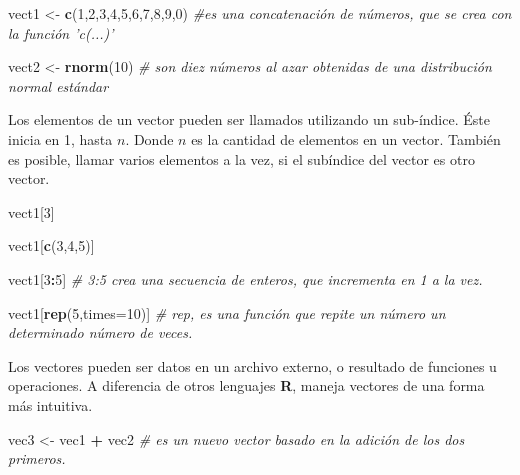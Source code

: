 \documentclass[12pt,letterpaper,]{book}
\newenvironment{Shaded}{\begin{snugshade}}{\end{snugshade}}
\newcommand{\KeywordTok}[1]{\textcolor[rgb]{0.13,0.29,0.53}{\textbf{#1}}}
\newcommand{\DataTypeTok}[1]{\textcolor[rgb]{0.13,0.29,0.53}{#1}}
\newcommand{\DecValTok}[1]{\textcolor[rgb]{0.00,0.00,0.81}{#1}}
\newcommand{\StringTok}[1]{\textcolor[rgb]{0.31,0.60,0.02}{#1}}
\newcommand{\CommentTok}[1]{\textcolor[rgb]{0.56,0.35,0.01}{\textit{#1}}}
\newcommand{\OperatorTok}[1]{\textcolor[rgb]{0.81,0.36,0.00}{\textbf{#1}}}
\newcommand{\NormalTok}[1]{#1}
\begin{document}
\begin{Shaded}
\begin{Highlighting}[]
\NormalTok{vect1 <-}\StringTok{ }\KeywordTok{c}\NormalTok{(}\DecValTok{1}\NormalTok{,}\DecValTok{2}\NormalTok{,}\DecValTok{3}\NormalTok{,}\DecValTok{4}\NormalTok{,}\DecValTok{5}\NormalTok{,}\DecValTok{6}\NormalTok{,}\DecValTok{7}\NormalTok{,}\DecValTok{8}\NormalTok{,}\DecValTok{9}\NormalTok{,}\DecValTok{0}\NormalTok{) }\CommentTok{#es una concatenación de números, que se crea con la función 'c(...)'}

\NormalTok{vect2 <-}\StringTok{ }\KeywordTok{rnorm}\NormalTok{(}\DecValTok{10}\NormalTok{) }\CommentTok{# son diez números al azar obtenidas de una distribución normal estándar}
\end{Highlighting}
\end{Shaded}

Los elementos de un vector pueden ser llamados utilizando un sub-índice.
Éste inicia en 1, hasta \(n\). Donde \(n\) es la cantidad de elementos
en un vector. También es posible, llamar varios elementos a la vez, si
el subíndice del vector es otro vector.

\begin{Shaded}
\begin{Highlighting}[]
\NormalTok{vect1[}\DecValTok{3}\NormalTok{]}

\NormalTok{vect1[}\KeywordTok{c}\NormalTok{(}\DecValTok{3}\NormalTok{,}\DecValTok{4}\NormalTok{,}\DecValTok{5}\NormalTok{)]}

\NormalTok{vect1[}\DecValTok{3}\OperatorTok{:}\DecValTok{5}\NormalTok{] }\CommentTok{# 3:5 crea una secuencia de enteros, que incrementa en 1 a la vez.}

\NormalTok{vect1[}\KeywordTok{rep}\NormalTok{(}\DecValTok{5}\NormalTok{,}\DataTypeTok{times=}\DecValTok{10}\NormalTok{)] }\CommentTok{# rep, es una función que repite un número un determinado número de veces.}
\end{Highlighting}
\end{Shaded}

Los vectores pueden ser datos en un archivo externo, o resultado de
funciones u operaciones. A diferencia de otros lenguajes \textbf{R},
maneja vectores de una forma más intuitiva.

\begin{Shaded}
\begin{Highlighting}[]
\NormalTok{vec3 <-}\StringTok{ }\NormalTok{vec1 }\OperatorTok{+}\StringTok{ }\NormalTok{vec2 }\CommentTok{# es un nuevo vector basado en la adición de los dos primeros.}
\end{Highlighting}
\end{Shaded}
\end{document}

